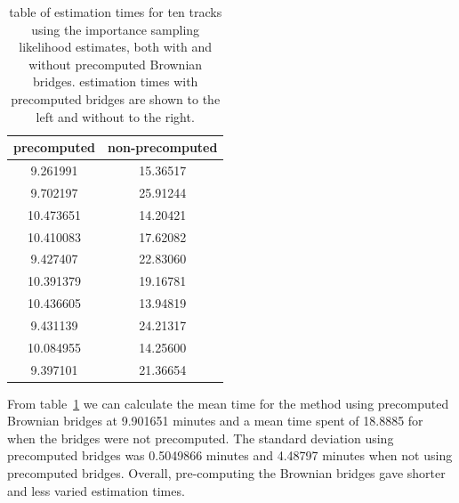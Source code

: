 \begin{table}[H]
    \centering
    \begin{tabular}{c|c}
        precomputed & non-precomputed \\
        \hline
        9.261991 & 15.36517 \\
        9.702197 & 25.91244 \\
        10.473651 & 14.20421 \\
        10.410083 & 17.62082 \\
        9.427407 & 22.83060 \\
        10.391379 & 19.16781 \\
        10.436605 & 13.94819 \\
        9.431139 & 24.21317 \\
        10.084955 & 14.25600 \\
        9.397101  & 21.36654 \\
    \end{tabular}
    \caption[table of estimation times with and without pre-computation of Brownian bridges]{table of estimation times for ten tracks using the importance sampling likelihood estimates, both with and without precomputed Brownian bridges. estimation times with precomputed bridges are shown to the left and without to the right.}
    \label{tab: times}
\end{table}


From table~\ref{tab: times} we can calculate the mean time for the method using precomputed Brownian bridges at 9.901651 minutes and a mean time spent of 18.8885 for when the bridges were not precomputed. The standard deviation using precomputed bridges was 0.5049866 minutes and 4.48797 minutes when not using precomputed bridges. Overall, pre-computing the Brownian bridges gave shorter and less varied estimation times.




